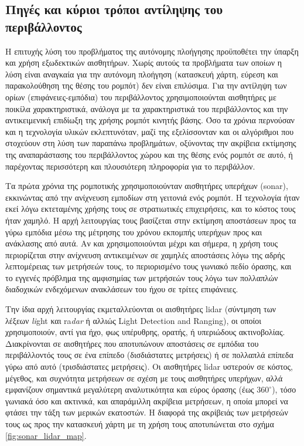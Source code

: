 \subsection{Πηγές και κύριοι τρόποι αντίληψης του περιβάλλοντος}
\label{subsec:01_01_01_2}

Η επιτυχής λύση του προβλήματος της αυτόνομης πλοήγησης προϋποθέτει την ύπαρξη
και χρήση εξωδεκτικών αισθητήρων. Χωρίς αυτούς τα προβλήματα των οποίων η λύση
είναι αναγκαία για την αυτόνομη πλοήγηση (κατασκευή χάρτη, εύρεση και
παρακολούθηση της θέσης του ρομπότ) δεν είναι επιλύσιμα. Για την αντίληψη των
ορίων (επιφάνειες-εμπόδια) του περιβάλλοντος χρησιμοποιούνται αισθητήρες με
ποικίλα χαρακτηριστικά, ανάλογα με τα χαρακτηριστικά του περιβάλλοντος και
την αντικειμενική επιδίωξη της χρήσης ρομπότ κινητής βάσης. Όσο τα χρόνια
περνούσαν και η τεχνολογία υλικών εκλεπτυνόταν, μαζί της εξελίσσονταν και
οι αλγόριθμοι που στοχεύουν στη λύση των παραπάνω προβλημάτων, οξύνοντας την
ακρίβεια εκτίμησης της αναπαράστασης του περιβάλλοντος χώρου και της θέσης ενός
ρομπότ σε αυτό, ή παρέχοντας περισσότερη και πλουσιότερη πληροφορία για το
περιβάλλον.

Τα πρώτα χρόνια της ρομποτικής χρησιμοποιούνταν αισθητήρες υπερήχων (sonar),
εκκινώντας από την ανίχνευση εμποδίων στη γειτονιά ενός ρομπότ. Η τεχνολογία
ήταν εκεί λόγω εκτεταμένης χρήσης τους σε στρατιωτικές επιχειρήσεις, και το
κόστος τους ήταν χαμηλό. Η αρχή λειτουργίας τους βασίζεται στην εκτίμηση
αποστάσεων προς τα γύρω εμπόδια μέσω της μέτρησης του χρόνου εκπομπής υπερήχων
προς και ανάκλασης από αυτά. Αν και χρησιμοποιούνται μέχρι και σήμερα, η χρήση
τους περιορίζεται στην ανίχνευση αντικειμένων σε χαμηλές αποστάσεις λόγω της
αδρής λεπτομέρειας των μετρήσεών τους, το περιορισμένο τους γωνιακό πεδίο
όρασης, και το εγγενές πρόβλημα της αμφισημίας των μετρήσεών τους λόγω των
πολλαπλών διαδοχικών ενδεχόμενων ανακλάσεων του ήχου σε τρίτες επιφάνειες.

Την ίδια αρχή λειτουργίας εκμεταλλεύονται οι αισθητήρες lidar (σύντμηση των
λέξεων \textit{li}ght και ra\textit{dar} ή αλλιώς Light Detection and Ranging),
οι οποίοι χρησιμοποιούν, αντί για ήχο, φως υπέρυθρης, ορατής, ή υπεριώδους
ακτινοβολίας. Διακρίνονται σε αισθητήρες που αποτυπώνουν αποστάσεις σε εμπόδια
του περιβάλλοντός τους σε ένα επίπεδο (δισδιάστατες μετρήσεις) ή σε πολλαπλά
επίπεδα γύρω από αυτό (τρισδιάστατες μετρήσεις). Οι αισθητήρες lidar υστερούν
σε κόστος, μέγεθος, και συχνότητα μετρήσεων σε σχέση με τους αισθητήρες
υπερήχων, αλλά εμφανίζουν σημαντικά μεγαλύτερη αναλυτικότητα και εύρος όρασης
(έως $360^\circ$), τόσο γωνιακά όσο και ακτινικά, και απαράμιλλη ακρίβεια
μετρήσεων, η οποία μπορεί να φτάσει την τάξη των μερικών εκατοστών. Η διαφορά
της ακρίβειάς των μετρήσεών τους ως προς την κατασκευή χάρτη με τη χρήση τους
αποτυπώνεται στο σχήμα \ref{fig:sonar_lidar_map}.

